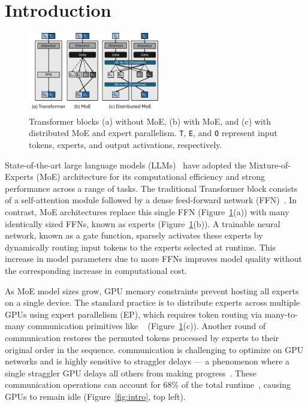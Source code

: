 \section{Introduction}\label{sec:introduction}

\begin{figure}
    \centering
    \includegraphics[width=0.51\textwidth, keepaspectratio]{figures/fig-bg-moe}
    \caption{Transformer blocks (a) without MoE, (b) with MoE, and (c) with distributed MoE and expert parallelism.
    \texttt{T}, \texttt{E}, and \texttt{O} represent input tokens, experts, and output activations, respectively.}
    \label{fig:bg:moe}
    \vspace{-10pt}
\end{figure}

State-of-the-art large language models (LLMs)~\cite{deepep, llama4, dbrx, arctic, openai2025gptoss} have adopted the Mixture-of-Experts (MoE) architecture for its computational efficiency and strong performance across a range of tasks. The traditional Transformer block consists of a self-attention module followed by a dense feed-forward network (FFN)~\cite{NIPS2017_3f5ee243}. In contrast, MoE architectures replace this single FFN (Figure~\ref{fig:bg:moe}(a)) with many identically sized FFNs, known as experts (Figure~\ref{fig:bg:moe}(b)). A trainable neural network, known as a gate function, sparsely activates these experts by dynamically routing input tokens to the experts selected at runtime. This increase in model parameters due to more FFNs improves model quality without the corresponding increase in computational cost.

As MoE model sizes grow, GPU memory constraints prevent hosting all experts on a single device. The standard practice is to distribute experts across multiple GPUs using expert parallelism (EP), which requires token routing via many-to-many communication primitives like \alltoall~\cite{deepep, arctic, dbrx, 10.1145/3577193.3593704} (Figure~\ref{fig:bg:moe}(c)). Another round of \alltoall communication restores the permuted tokens processed by experts to their original order in the sequence. \alltoall communication is challenging to optimize on GPU networks and is highly sensitive to straggler delays --- a phenomenon where a single straggler GPU delays all others from making progress~\cite{stragglar}. These communication operations can account for 68\% of the total runtime~\cite{10.1145/3603269.3604869, MLSYS2024_339caf45}, causing GPUs to remain idle (Figure~\ref{fig:intro}, top left).


